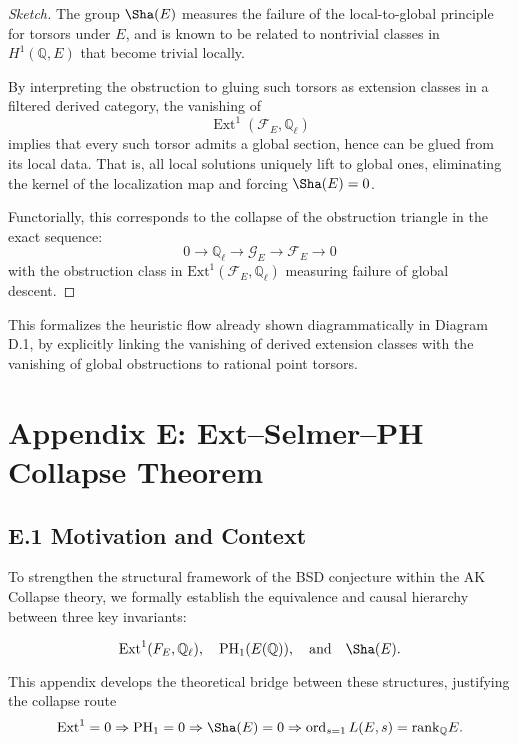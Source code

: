 \begin{proof}[Sketch]
The group \( \Sha(E) \) measures the failure of the local-to-global principle for torsors under \( E \), and is known to be related to nontrivial classes in \( H^1(\mathbb{Q}, E) \) that become trivial locally.

By interpreting the obstruction to gluing such torsors as extension classes in a filtered derived category, the vanishing of
\[
\operatorname{Ext}^1(\mathcal{F}_E, \mathbb{Q}_\ell)
\]
implies that every such torsor admits a global section, hence can be glued from its local data. That is, all local solutions uniquely lift to global ones, eliminating the kernel of the localization map and forcing \( \Sha(E) = 0 \).

Functorially, this corresponds to the collapse of the obstruction triangle in the exact sequence:
\[
0 \to \mathbb{Q}_\ell \to \mathcal{G}_E \to \mathcal{F}_E \to 0
\]
with the obstruction class in \( \mathrm{Ext}^1(\mathcal{F}_E, \mathbb{Q}_\ell) \) measuring failure of global descent.
\end{proof}

\begin{remark}
This formalizes the heuristic flow already shown diagrammatically in Diagram D.1, by explicitly linking the vanishing of derived extension classes with the vanishing of global obstructions to rational point torsors. 
\end{remark}




\section*{Appendix E: Ext--Selmer--PH Collapse Theorem}

\subsection*{E.1 Motivation and Context}

To strengthen the structural framework of the BSD conjecture within the AK Collapse theory,  
we formally establish the equivalence and causal hierarchy between three key invariants:

\[
\mathrm{Ext}^1(F_E, \mathbb{Q}_\ell), \quad \mathrm{PH}_1(E(\mathbb{Q})), \quad \text{and} \quad \Sha(E).
\]

This appendix develops the theoretical bridge between these structures, justifying the collapse route  
\[
\mathrm{Ext}^1 = 0 \Rightarrow \mathrm{PH}_1 = 0 \Rightarrow \Sha(E) = 0 \Rightarrow \operatorname{ord}_{s=1}L(E,s) = \mathrm{rank}_\mathbb{Q}E.
\]


